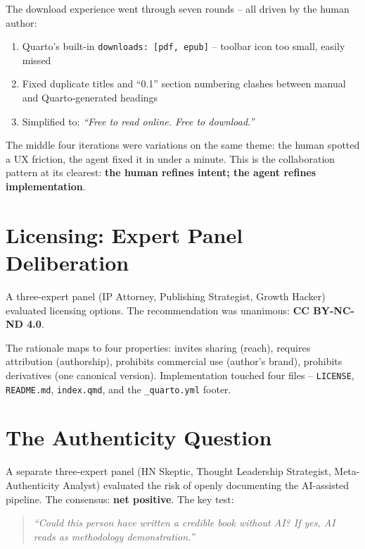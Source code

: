 \documentclass[
  a4paper,
  DIV=11,
  numbers=noendperiod]{scrreprt}
\providecommand{\tightlist}{%
  \setlength{\itemsep}{0pt}\setlength{\parskip}{0pt}}
\begin{document}
The download experience went through seven rounds -- all driven by the
human author:

\begin{enumerate}
\def\labelenumi{\arabic{enumi}.}
\tightlist
\item
  Quarto's built-in \texttt{downloads:\ {[}pdf,\ epub{]}} -- toolbar
  icon too small, easily missed
\item
  Fixed duplicate titles and ``0.1'' section numbering clashes between
  manual and Quarto-generated headings
\item
  Simplified to: \emph{``Free to read online. Free to download.''}
\end{enumerate}

The middle four iterations were variations on the same theme: the human
spotted a UX friction, the agent fixed it in under a minute. This is the
collaboration pattern at its clearest: \textbf{the human refines intent;
the agent refines implementation}.

\section{Licensing: Expert Panel
Deliberation}\label{licensing-expert-panel-deliberation}

A three-expert panel (IP Attorney, Publishing Strategist, Growth Hacker)
evaluated licensing options. The recommendation was unanimous:
\textbf{CC BY-NC-ND 4.0}.

The rationale maps to four properties: invites sharing (reach), requires
attribution (authorship), prohibits commercial use (author's brand),
prohibits derivatives (one canonical version). Implementation touched
four files -- \texttt{LICENSE}, \texttt{README.md}, \texttt{index.qmd},
and the \texttt{\_quarto.yml} footer.

\section{The Authenticity Question}\label{the-authenticity-question}

A separate three-expert panel (HN Skeptic, Thought Leadership
Strategist, Meta-Authenticity Analyst) evaluated the risk of openly
documenting the AI-assisted pipeline. The consensus: \textbf{net
positive}. The key test:

\begin{quote}
\emph{``Could this person have written a credible book without AI? If
yes, AI reads as methodology demonstration.''}
\end{quote}
\end{document}
